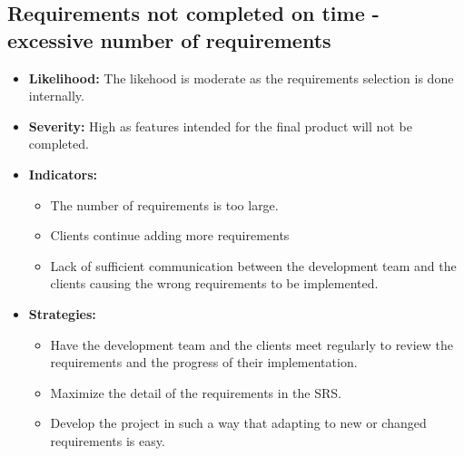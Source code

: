 \documentclass{article}
\begin{document}
\subsection{Requirements not completed on time - excessive number of requirements}
\begin{itemize}
	\item \textbf{Likelihood:} The likehood is moderate as the requirements selection is done internally.
	\item \textbf{Severity:} High as features intended for the final product will not be completed.
	\item \textbf{Indicators:}
		\begin{itemize}
			\item The number of requirements is too large.
			\item Clients continue adding more requirements
			\item Lack of sufficient communication between the development team and the clients causing the wrong requirements to be implemented.
		\end{itemize}
	\item \textbf{Strategies:} 
		\begin{itemize}
			\item Have the development team and the clients meet regularly to review the requirements and the progress of their implementation.
			\item Maximize the detail of the requirements in the SRS.
			\item Develop the project in such a way that adapting to new or changed requirements is easy. 
		\end{itemize}
\end{itemize}
\end{document}

